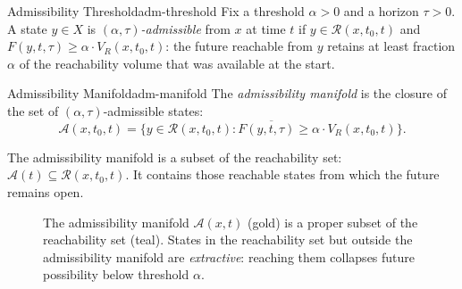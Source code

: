 \documentclass[12pt,twoside,openright]{book}
\newcommand{\reach}{\mathcal{R}}
\newcommand{\adm}{\mathcal{A}}
\begin{document}
\begin{definition}{Admissibility Threshold}{adm-threshold}
  Fix a threshold $\alpha>0$ and a horizon $\tau>0$. A
  state $y\in X$ is \emph{$(\alpha,\tau)$-admissible} from
  $x$ at time $t$ if $y\in\reach(x,t_0,t)$ and
  $F(y,t,\tau) \ge \alpha\cdot V_R(x,t_0,t)$: the future
  reachable from $y$ retains at least fraction $\alpha$ of
  the reachability volume that was available at the start.
\end{definition}

\begin{definition}{Admissibility Manifold}{adm-manifold}
  The \emph{admissibility manifold} is the closure of the
  set of $(\alpha,\tau)$-admissible states:
  \[
    \adm(x,t_0,t)
    = \overline{\{
        y \in \reach(x,t_0,t) :
        F(y,t,\tau) \ge \alpha\cdot V_R(x,t_0,t)
      \}}.
  \]
\end{definition}

The admissibility manifold is a subset of the reachability
set: $\adm(t) \subseteq \reach(x,t_0,t)$. It contains those
reachable states from which the future remains open.

\begin{figure}[h]
\centering
{}
\caption{The admissibility manifold $\adm(x,t)$ (gold) is a
  proper subset of the reachability set (teal). States in
  the reachability set but outside the admissibility
  manifold are \emph{extractive}: reaching them collapses
  future possibility below threshold $\alpha$.}
\label{fig:adm-manifold}
\end{figure}
\end{document}
